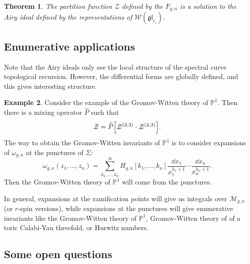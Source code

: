 \documentclass{amsart}
\newtheorem{thm}{Theorem}[section]
\theoremstyle{definition}
\newtheorem{exm}[thm]{Example}
\theoremstyle{remark}
\theoremstyle{plain}
\theoremstyle{definition}
\theoremstyle{remark}
\renewcommand{\P}{\mathbb{P}}
\newcommand{\mc}[1]{\mathcal{#1}}
\newcommand{\mf}[1]{\mathfrak{#1}}
\newcommand{\ol}[1]{\overline{#1}}
\newcommand{\wh}[1]{\widehat{#1}}
\newcommand{\1}{\mathbf{1}}
\newcommand{\2}{\mathbf{2}}
\newcommand{\3}{\mathbf{3}}
\begin{document}
\begin{thm}
    The partition function $\mc{Z}$ defined by the $F_{g,n}$ is a solution to the Airy ideal defined by the representations of $\mc{W}(\mf{gl}_{r_i})$.
\end{thm}

\subsection{Enumerative applications}

Note that the Airy ideals only see the local structure of the spectral curve topological recursion. However, the differential forms are globally defined, and this gives interesting structure.

\begin{exm}
    Consider the example of the Gromov-Witten theory of $\P^1$. Then there is a mixing operator $\wh{P}$ such that
    \[ \mc{Z} = \wh{P} \qty[\mc{Z}^{(2,3)} \cdot \mc{Z}^{(2,3)}]. \]
    The way to obtain the Gromov-Witten invariants of $\P^1$ is to consider expansions of $\omega_{g, n}$ at the punctures of $\Sigma$:
    \[ \omega_{g, n}(z_1, \ldots, z_n) = \sum_{k_1, \ldots, k_n}^{\infty}H_{g,n}[k_1, \ldots, k_n] \frac{\dd{x_1}}{x_1^{h_1+1}} \cdots \frac{\dd{x_n}}{x_n^{h_n+1}}. \]
    Then the Gromov-Witten theory of $\P^1$ will come from the punctures.
\end{exm}

In general, expansions at the ramification points will give us integrals over $\ol{\mc{M}}_{g, n}$ (or $r$-spin versions), while expansions at the punctures will give enumerative invariants like the Gromov-Witten theory of $\P^1$, Gromov-Witten theory of of a toric Calabi-Yau threefold, or Hurwitz numbers.

\subsection{Some open questions}
\end{document}
